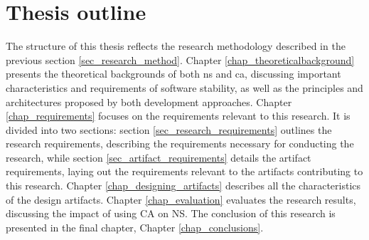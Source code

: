 \section{Thesis outline} \label{sec_structure}

The structure of this thesis reflects the research methodology described in the previous
section \ref{sec_research_method}. Chapter \ref{chap_theoreticalbackground} presents the
theoretical backgrounds of both \gls{ns} and \gls{ca}, discussing important
characteristics and requirements of software stability, as well as the principles and
architectures proposed by both development approaches. Chapter \ref{chap_requirements}
focuses on the requirements relevant to this research. It is divided into two sections:
section \ref{sec_research_requirements} outlines the research requirements, describing the
requirements necessary for conducting the research, while section
\ref{sec_artifact_requirements} details the artifact requirements, laying out the
requirements relevant to the artifacts contributing to this research. Chapter
\ref{chap_designing_artifacts} describes all the characteristics of the design artifacts.
Chapter \ref{chap_evaluation} evaluates the research results, discussing the impact of
using CA on NS. The conclusion of this research is presented in the final chapter, Chapter
\ref{chap_conclusions}.